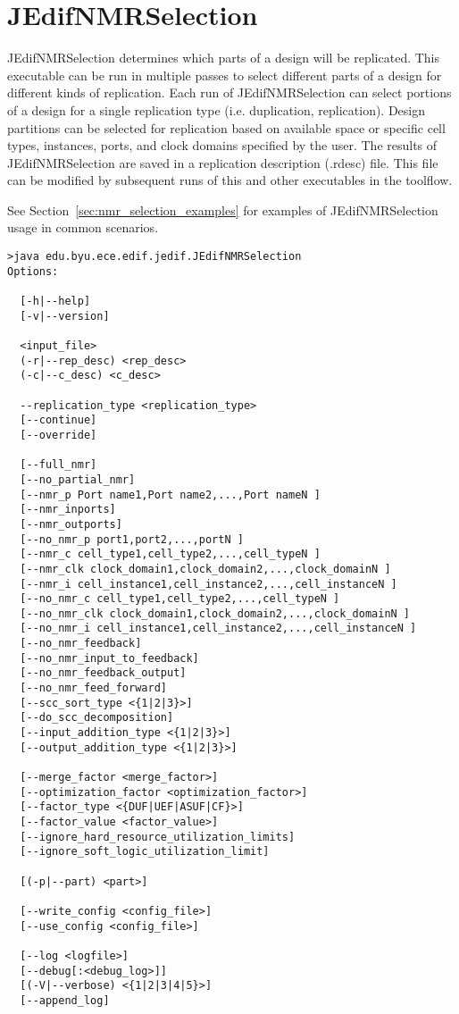\section{JEdifNMRSelection}
JEdifNMRSelection determines which parts of a design will be
replicated. This executable can be run in multiple passes to select
different parts of a design for different kinds of replication. Each
run of JEdifNMRSelection can select portions of a design for a single
replication type (i.e. duplication, replication). Design partitions can
be selected for replication based on available space or specific cell
types, instances, ports, and clock domains specified by the user. The
results of JEdifNMRSelection are saved in a replication description
(.rdesc) file. This file can be modified by subsequent runs of this
and other executables in the toolflow.

See Section~\ref{sec:nmr_selection_examples} for examples of JEdifNMRSelection
usage in common scenarios.

\begin{verbatim}
>java edu.byu.ece.edif.jedif.JEdifNMRSelection
Options:

  [-h|--help]
  [-v|--version]

  <input_file>
  (-r|--rep_desc) <rep_desc>
  (-c|--c_desc) <c_desc>

  --replication_type <replication_type>
  [--continue]
  [--override]

  [--full_nmr]
  [--no_partial_nmr]
  [--nmr_p Port name1,Port name2,...,Port nameN ]
  [--nmr_inports]
  [--nmr_outports]
  [--no_nmr_p port1,port2,...,portN ]
  [--nmr_c cell_type1,cell_type2,...,cell_typeN ]
  [--nmr_clk clock_domain1,clock_domain2,...,clock_domainN ]
  [--nmr_i cell_instance1,cell_instance2,...,cell_instanceN ]
  [--no_nmr_c cell_type1,cell_type2,...,cell_typeN ]
  [--no_nmr_clk clock_domain1,clock_domain2,...,clock_domainN ]
  [--no_nmr_i cell_instance1,cell_instance2,...,cell_instanceN ]
  [--no_nmr_feedback]
  [--no_nmr_input_to_feedback]
  [--no_nmr_feedback_output]
  [--no_nmr_feed_forward]
  [--scc_sort_type <{1|2|3}>]
  [--do_scc_decomposition]
  [--input_addition_type <{1|2|3}>]
  [--output_addition_type <{1|2|3}>]

  [--merge_factor <merge_factor>]
  [--optimization_factor <optimization_factor>]
  [--factor_type <{DUF|UEF|ASUF|CF}>]
  [--factor_value <factor_value>]
  [--ignore_hard_resource_utilization_limits]
  [--ignore_soft_logic_utilization_limit]

  [(-p|--part) <part>]

  [--write_config <config_file>]
  [--use_config <config_file>]

  [--log <logfile>]
  [--debug[:<debug_log>]]
  [(-V|--verbose) <{1|2|3|4|5}>]
  [--append_log]
\end{verbatim}

